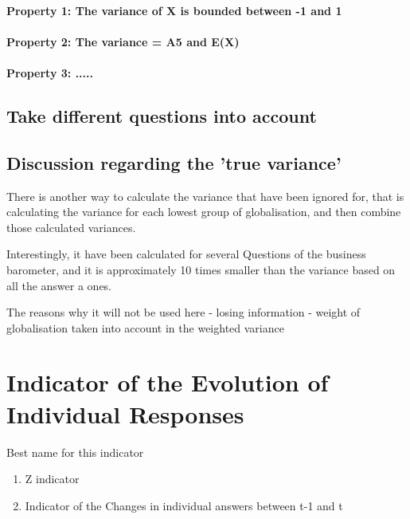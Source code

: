 \documentclass[12pt,a4paper,oneside]{book}
\begin{document}
\subsubsection{Property 1: The variance of X is bounded between -1 and 1}

\subsubsection{Property 2: The variance = A5 and E(X)}


\subsubsection{Property 3: .....}


\section{Take different questions into account}





\section{Discussion regarding the 'true variance'}

There is another way to calculate the variance that have been ignored for, that is calculating the variance for each lowest group of globalisation, and then combine those calculated variances.


Interestingly, it have been calculated for several Questions of the business barometer, and it is approximately 10 times smaller than the variance based on all the answer a ones.



The reasons why it will not be used here
- losing information
- weight of globalisation taken into account in the weighted variance




\chapter{Indicator of the Evolution of Individual Responses}

Best name for this indicator
\begin{enumerate}
    \item Z indicator
    \item Indicator of the Changes in individual answers between t-1 and t
\end{enumerate}
\end{document}
